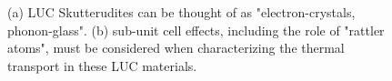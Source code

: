 \documentclass[letterpaper,12pt]{article}
\begin{document}
\begin{figure}[ht]
\centering
{}
\caption[Optional caption for list of figures]{\label{FIG:elec_crys_phonon_glass} (a) LUC Skutterudites can be thought of as "electron-crystals, phonon-glass". (b) sub-unit cell effects, including the role of "rattler atoms", must be considered when characterizing the thermal transport in these LUC materials.}
\end{figure}
\end{document}
